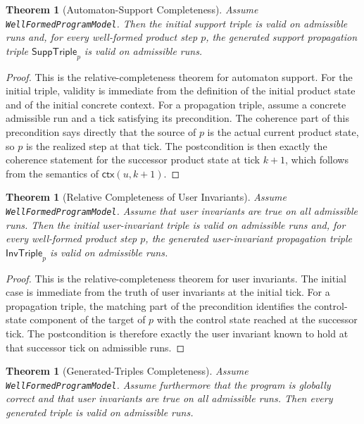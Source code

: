 \documentclass[11pt,a4paper]{article}
\newtheorem{theorem}[definition]{Theorem}
\newcommand{\ctx}{\mathsf{ctx}}
\begin{document}
\begin{theorem}[Automaton-Support Completeness]
Assume \texttt{WellFormedProgramModel}. Then the initial support triple is
valid on admissible runs and, for every well-formed product step \(p\), the
generated support propagation triple \(\mathsf{SuppTriple}_p\) is valid on
admissible runs.
\end{theorem}

\begin{proof}
This is the relative-completeness theorem for automaton support. For the
initial triple, validity is immediate from the definition of the initial
product state and of the initial concrete context. For a propagation triple,
assume a concrete admissible run and a tick satisfying its precondition. The
coherence part of this precondition says directly that the source of \(p\) is
the actual current product state, so \(p\) is the realized step at that tick.
The postcondition is then exactly the coherence statement for the successor
product state at tick \(k+1\), which follows from the semantics of
\(\ctx(u,k+1)\).
\end{proof}

\begin{theorem}[Relative Completeness of User Invariants]
Assume \texttt{WellFormedProgramModel}. Assume that user invariants are true on
all admissible runs. Then the initial user-invariant triple is valid on
admissible runs and, for every well-formed product step \(p\), the generated
user-invariant propagation triple \(\mathsf{InvTriple}_p\) is valid on
admissible runs.
\end{theorem}

\begin{proof}
This is the relative-completeness theorem for user invariants. The initial
case is immediate from the truth of user invariants at the initial tick. For a
propagation triple, the matching part of the precondition identifies the
control-state component of the target of \(p\) with the control state reached
at the successor tick. The postcondition is therefore exactly the user
invariant known to hold at that successor tick on admissible runs.
\end{proof}

\begin{theorem}[Generated-Triples Completeness]
Assume \texttt{WellFormedProgramModel}. Assume furthermore that the program is
globally correct and that user invariants are true on all admissible runs.
Then every generated triple is valid on admissible runs.
\end{theorem}
\end{document}
